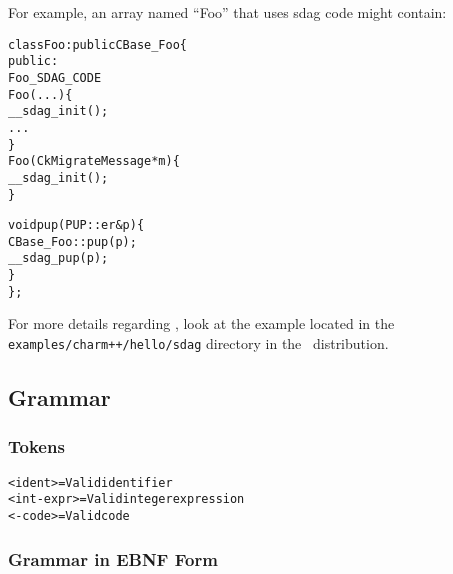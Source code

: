 For example, an array named ``Foo'' that uses sdag code might contain:

\begin{alltt}
class Foo : public CBase_Foo \{
public:
    Foo_SDAG_CODE
    Foo(...) \{
       __sdag_init();
       ...
    \}
    Foo(CkMigrateMessage *m) \{
       __sdag_init();
    \}
    
    void pup(PUP::er &p) \{
       CBase_Foo::pup(p);
       __sdag_pup(p);
    \}
\};
\end{alltt}

For more details regarding \sdag{}, look at the example located in the 
{\tt examples/charm++/hello/sdag} directory in the \charmpp\ distribution.


\subsection{Grammar}

\subsubsection{Tokens}

\begin{alltt}
  <ident> = Valid \CC{} identifier 
  <int-expr> = Valid \CC{} integer expression 
  <\CC{}-code> = Valid \CC{} code 
\end{alltt}

\subsubsection{Grammar in EBNF Form}

